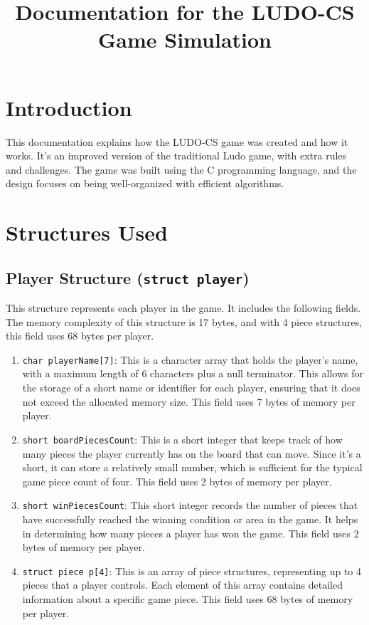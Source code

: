 \documentclass{article}
\title{Documentation for the LUDO-CS Game Simulation}
\date{}
\begin{document}
\maketitle

\section{Introduction}
This documentation explains how the LUDO-CS game was created and how it works. It’s an improved version of the traditional Ludo game, with extra rules and challenges. The game was built using the C programming language, and the design focuses on being well-organized with efficient algorithms.

\section{Structures Used}

\subsection{Player Structure (\texttt{struct player})}
This structure represents each player in the game. It includes the following fields. The memory complexity of this structure is 17 bytes, and with 4 piece structures, this field uses 68 bytes per player.

\begin{enumerate}
    \item \texttt{char playerName[7]}: This is a character array that holds the player's name, with a maximum length of 6 characters plus a null terminator. This allows for the storage of a short name or identifier for each player, ensuring that it does not exceed the allocated memory size. This field uses 7 bytes of memory per player.
    \item \texttt{short boardPiecesCount}: This is a short integer that keeps track of how many pieces the player currently has on the board that can move. Since it's a short, it can store a relatively small number, which is sufficient for the typical game piece count of four. This field uses 2 bytes of memory per player.
    \item \texttt{short winPiecesCount}: This short integer records the number of pieces that have successfully reached the winning condition or area in the game. It helps in determining how many pieces a player has won the game. This field uses 2 bytes of memory per player.
    \item \texttt{struct piece p[4]}: This is an array of piece structures, representing up to 4 pieces that a player controls. Each element of this array contains detailed information about a specific game piece. This field uses 68 bytes of memory per player.
\end{enumerate}
\end{document}
